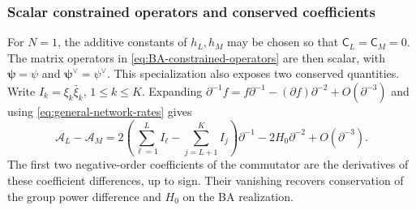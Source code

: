 \subsubsection{Scalar constrained operators and conserved coefficients}

For $N=1$, the additive constants of $h_L,h_M$ may be chosen so that
$\mathsf C_L=\mathsf C_M=0$. The matrix operators in
\cref{eq:BA-constrained-operators} are then scalar, with
$\boldsymbol\psi=\psi$ and $\boldsymbol\psi^\vee=\psi^\vee$.
This specialization also exposes two conserved quantities.
Write $I_k=\xi_k\bar\xi_k$, $1\leq k\leq K$. Expanding $\partial^{-1}f=f\partial^{-1}-(\partial f)\partial^{-2}
+O(\partial^{-3})$ and using \cref{eq:general-network-rates} gives
\begin{equation}\label{eq:BA-constrained-H-coefficient}
 \mathcal A_L-\mathcal A_M
 =2\left(\sum_{\ell=1}^{L}I_\ell-\sum_{j=L+1}^{K}I_j\right)\partial^{-1}
      -2H_0\partial^{-2}+O(\partial^{-3}).
\end{equation}
The first two negative-order coefficients of the commutator are
the derivatives of these coefficient differences, up to sign.
Their vanishing recovers conservation of the group power difference
and $H_0$ on the BA realization.
